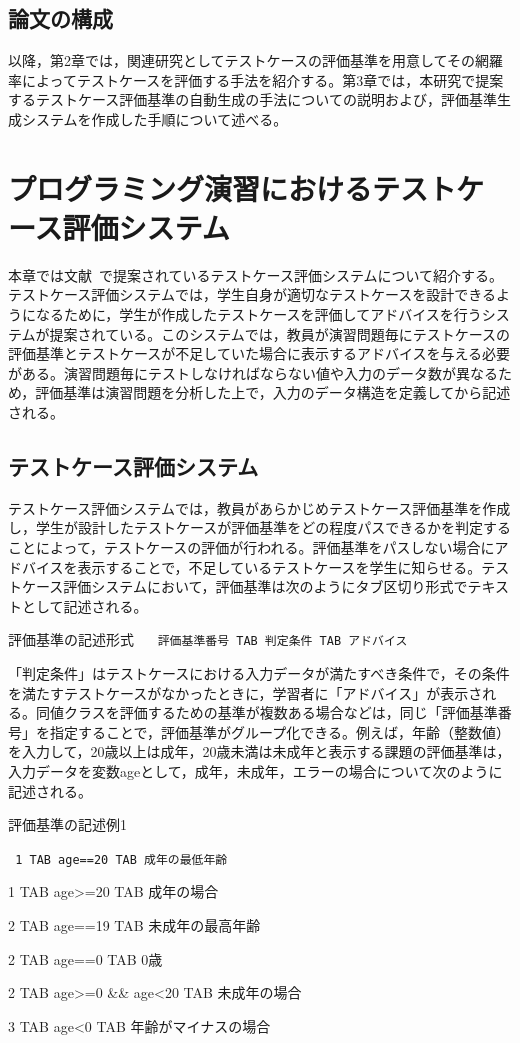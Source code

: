 \documentclass{tpu-sotu}
\begin{document}
\section{論文の構成}
以降，第2章では，関連研究としてテストケースの評価基準を用意してその網羅率によってテストケースを評価する手法を紹介する。第3章では，本研究で提案するテストケース評価基準の自動生成の手法についての説明および，評価基準生成システムを作成した手順について述べる。
\chapter{プログラミング演習におけるテストケース評価システム}
本章では文献~\cite{a1}で提案されているテストケース評価システムについて紹介する。テストケース評価システムでは，学生自身が適切なテストケースを設計できるようになるために，学生が作成したテストケースを評価してアドバイスを行うシステムが提案されている。このシステムでは，教員が演習問題毎にテストケースの評価基準とテストケースが不足していた場合に表示するアドバイスを与える必要がある。演習問題毎にテストしなければならない値や入力のデータ数が異なるため，評価基準は演習問題を分析した上で，入力のデータ構造を定義してから記述される。
\section{テストケース評価システム}
テストケース評価システムでは，教員があらかじめテストケース評価基準を作成し，学生が設計したテストケースが評価基準をどの程度パスできるかを判定することによって，テストケースの評価が行われる。評価基準をパスしない場合にアドバイスを表示することで，不足しているテストケースを学生に知らせる。テストケース評価システムにおいて，評価基準は次のようにタブ区切り形式でテキストとして記述される。\\
\begin{minipage}[b]{\textwidth}
\begin{itembox}[l]{評価基準の記述形式}
{\tt
　評価基準番号 TAB 判定条件 TAB アドバイス
}
\end{itembox}
\end{minipage}

「判定条件」はテストケースにおける入力データが満たすべき条件で，その条件を満たすテストケースがなかったときに，学習者に「アドバイス」が表示される。同値クラスを評価するための基準が複数ある場合などは，同じ「評価基準番号」を指定することで，評価基準がグループ化できる。例えば，年齢（整数値）を入力して，20歳以上は成年，20歳未満は未成年と表示する課題の評価基準は，入力データを変数ageとして，成年，未成年，エラーの場合について次のように記述される。\\
\begin{minipage}[b]{\textwidth}
\begin{itembox}[l]{評価基準の記述例1}
{\tt
1 TAB age==20 TAB 成年の最低年齢

1 TAB age>=20 TAB 成年の場合

2 TAB age==19 TAB 未成年の最高年齢

2 TAB age==0 TAB 0歳

2 TAB age>=0 \&\& age<20 TAB 未成年の場合

3 TAB age<0 TAB 年齢がマイナスの場合
}
\end{itembox}
\end{minipage}
\end{document}
